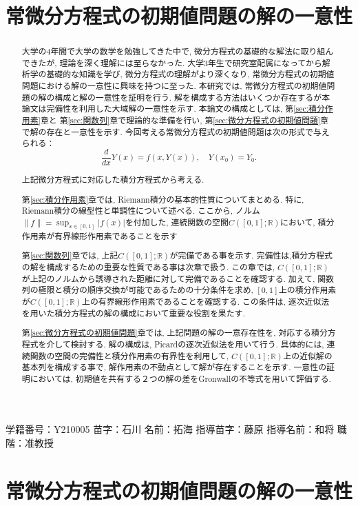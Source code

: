 \documentclass[12pt]{bxjsarticle}
\begin{document}
\newcommand{\Nendo}{2024年度} %
\newcommand{\GakusekiNum}[1]{学籍番号：#1}
\newcommand{\Myouji}[1]{苗字：#1}
\newcommand{\Namae}[1]{名前：#1}
\newcommand{\ShidouMyouji}[1]{指導苗字：#1}
\newcommand{\ShidouNamae}[1]{指導名前：#1}
\newcommand{\Shokukai}[1]{職階：#1}
\GakusekiNum{Y210005} %
\Myouji{石川}          %
\Namae{拓海}          %
\ShidouMyouji{藤原}   %
\ShidouNamae{和将}    %
\Shokukai{准教授}

\part{常微分方程式の初期値問題の解の一意性}

\title{常微分方程式の初期値問題の解の一意性}
\begin{abstract}
\label{sec:intro}
大学の4年間で大学の数学を勉強してきた中で,
微分方程式の基礎的な解法に取り組んできたが,
理論を深く理解には至らなかった.
大学3年生で研究室配属になってから解析学の基礎的な知識を学び,
微分方程式の理解がより深くなり,
常微分方程式の初期値問題における解の一意性に興味を持つに至った.
本研究では, 常微分方程式の初期値問題の解の構成と解の一意性を証明を行う.
解を構成する方法はいくつか存在するが本論文は完備性を利用した大域解の一意性を示す.
本論文の構成としては,
第\ref{sec:積分作用素}章と
第\ref{sec:関数列}章で理論的な準備を行い,
第\ref{sec:微分方程式の初期値問題}章で解の存在と一意性を示す.
今回考える常微分方程式の初期値問題は次の形式で与えられる：
	\[
	\frac{d}{dx}Y(x) = f(x, Y(x)),
	\quad Y(x_{0}) = Y_{0}.
	\]

上記微分方程式に対応した積分方程式から考える.

第\ref{sec:積分作用素}章では,
Riemann積分の基本的性質についてまとめる.
特に, Riemann積分の線型性と単調性について述べる.
ここから,
ノルム$\|f\| = \sup_{x \in [0,1]} |f(x)|$を付加した,
連続関数の空間$C([0,1];\mathbb{R})$において,
積分作用素が有界線形作用素であることを示す

第\ref{sec:関数列}章では,
上記$C([0,1];\mathbb{R})$が完備である事を示す.
完備性は,積分方程式の解を構成するための重要な性質である事は次章で扱う.
この章では,
$C([0,1];\mathbb{R})$が上記のノルムから誘導された距離に対して完備であることを確認する.
加えて,
関数列の極限と積分の順序交換が可能であるための十分条件を求め,
$[0,1]$上の積分作用素が$C([0,1];\mathbb{R})$上の有界線形作用素であることを確認する.
この条件は, 逐次近似法を用いた積分方程式の解の構成において重要な役割を果たす.

第\ref{sec:微分方程式の初期値問題}章では,
上記問題の解の一意存在性を,
対応する積分方程式を介して検討する.
解の構成は,
Picardの逐次近似法を用いて行う.
具体的には,
連続関数の空間の完備性と積分作用素の有界性を利用して,
$C([0,1];\mathbb{R})$上の近似解の基本列を構成する事で,
解作用素の不動点として解が存在することを示す.
一意性の証明においては,
初期値を共有する２つの解の差をGronwallの不等式を用いて評価する.
\end{abstract}
\maketitle
\Mokuji
\end{document}
